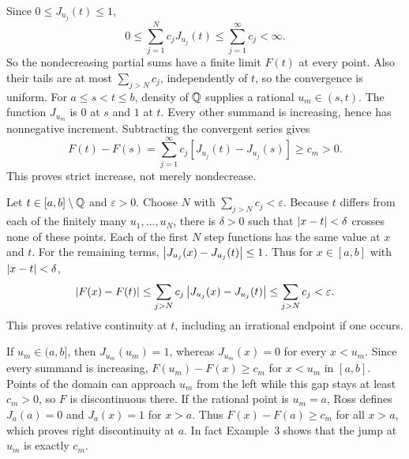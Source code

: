 Since $0\le J_{u_j}(t)\le1$,
\[
 0\le\sum_{j=1}^Nc_jJ_{u_j}(t)\le\sum_{j=1}^{\infty}c_j<\infty.
\]
So the nondecreasing partial sums have a finite limit $F(t)$ at
every point. Also their tails are at most $\sum_{j>N}c_j$,
independently of $t$, so the convergence is uniform.
For $a\le s<t\le b$, density of $\mathbb{Q}$ supplies a rational
$u_m\in(s,t)$. The function $J_{u_m}$ is $0$ at $s$ and $1$ at
$t$. Every other summand is increasing, hence has nonnegative
increment. Subtracting the convergent series gives
\[
 F(t)-F(s)
 =\sum_{j=1}^{\infty}c_j[J_{u_j}(t)-J_{u_j}(s)]
 \ge c_m>0.
\]
This proves strict increase, not merely nondecrease.

Let $t\in[a,b]\setminus\mathbb{Q}$ and $\varepsilon>0$. Choose $N$
with $\sum_{j>N}c_j<\varepsilon$. Because $t$ differs from each
of the finitely many $u_1,\ldots,u_N$, there is $\delta>0$ such
that $\left|x-t\right|<\delta$ crosses none of these points. Each of
the first $N$ step functions has the same value at $x$ and $t$.
For the remaining terms, $\left|J_{u_j}(x)-J_{u_j}(t)\right|\le1$.
Thus for $x\in[a,b]$ with $\left|x-t\right|<\delta$,
\[
 \left|F(x)-F(t)\right|
 \le\sum_{j>N}c_j\left|J_{u_j}(x)-J_{u_j}(t)\right|
 \le\sum_{j>N}c_j<\varepsilon.
\]
This proves relative continuity at $t$, including an irrational
endpoint if one occurs.

If $u_m\in(a,b]$, then $J_{u_m}(u_m)=1$, whereas
$J_{u_m}(x)=0$ for every $x<u_m$. Since every summand is
increasing, $F(u_m)-F(x)\ge c_m$ for $x<u_m$ in $[a,b]$.
Points of the domain can approach $u_m$ from the left while this
gap stays at least $c_m>0$, so $F$ is discontinuous there.
If the rational point is $u_m=a$, Ross defines $J_a(a)=0$ and
$J_a(x)=1$ for $x>a$. Thus $F(x)-F(a)\ge c_m$ for all $x>a$,
which proves right discontinuity at $a$.
In fact Example~3 shows that the jump at $u_m$ is exactly $c_m$.
